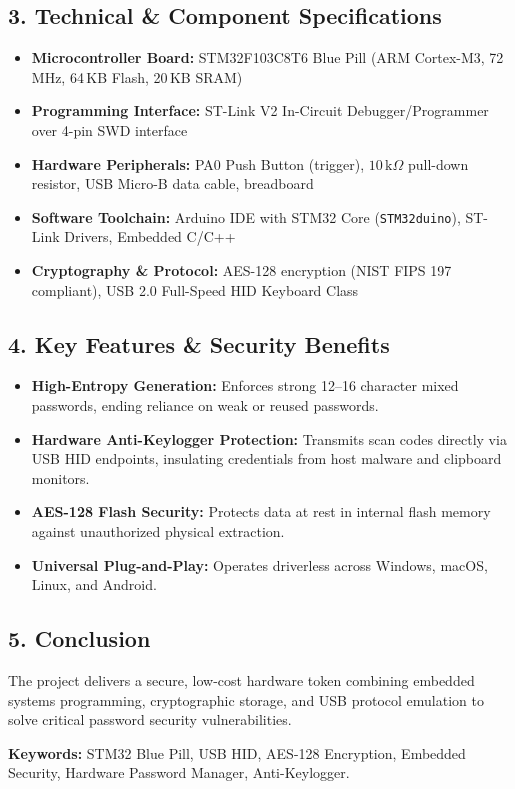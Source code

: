 \documentclass[12pt,a4paper]{article}
\begin{document}
\subsection*{3. Technical & Component Specifications}
\begin{itemize}
    \item \textbf{Microcontroller Board:} STM32F103C8T6 Blue Pill (ARM Cortex-M3, 72\,MHz, 64\,KB Flash, 20\,KB SRAM)
    \item \textbf{Programming Interface:} ST-Link V2 In-Circuit Debugger/Programmer over 4-pin SWD interface
    \item \textbf{Hardware Peripherals:} PA0 Push Button (trigger), $10\,\text{k}\Omega$ pull-down resistor, USB Micro-B data cable, breadboard
    \item \textbf{Software Toolchain:} Arduino IDE with STM32 Core (\texttt{STM32duino}), ST-Link Drivers, Embedded C/C++
    \item \textbf{Cryptography & Protocol:} AES-128 encryption (NIST FIPS 197 compliant), USB 2.0 Full-Speed HID Keyboard Class
\end{itemize}

\vspace{0.3cm}

\subsection*{4. Key Features & Security Benefits}
\begin{itemize}
    \item \textbf{High-Entropy Generation:} Enforces strong 12--16 character mixed passwords, ending reliance on weak or reused passwords.
    \item \textbf{Hardware Anti-Keylogger Protection:} Transmits scan codes directly via USB HID endpoints, insulating credentials from host malware and clipboard monitors.
    \item \textbf{AES-128 Flash Security:} Protects data at rest in internal flash memory against unauthorized physical extraction.
    \item \textbf{Universal Plug-and-Play:} Operates driverless across Windows, macOS, Linux, and Android.
\end{itemize}

\vspace{0.3cm}

\subsection*{5. Conclusion}
The project delivers a secure, low-cost hardware token combining embedded systems programming, cryptographic storage, and USB protocol emulation to solve critical password security vulnerabilities.

\vspace{0.5cm}

\noindent
\textbf{Keywords:} STM32 Blue Pill, USB HID, AES-128 Encryption, Embedded Security, Hardware Password Manager, Anti-Keylogger.
\end{document}
